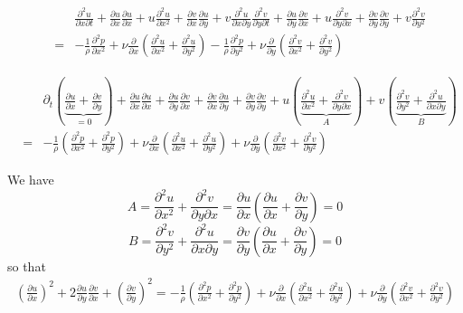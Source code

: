 \begin{eqnarray}
&&\frac{\partial^2 u}{\partial x \partial t}  
+ \frac{\partial u}{\partial x} \frac{\partial u}{\partial x}+ u \frac{\partial^2 u}{\partial x^2}
+ \frac{\partial v}{\partial x} \frac{\partial u}{\partial y}+ v \frac{\partial^2 u}{\partial x\partial y}
\frac{\partial^2 v}{\partial y \partial t}  
+ \frac{\partial u}{\partial y} \frac{\partial v}{\partial x}+ u \frac{\partial^2 v}{\partial y\partial x}
+ \frac{\partial v}{\partial y} \frac{\partial v}{\partial y}+ v \frac{\partial^2 v}{\partial y^2} \\
&=&
-\frac{1}{\rho} \frac{\partial^2 p}{\partial x^2} 
+ \nu \frac{\partial }{\partial x} \left( \frac{\partial^2 u}{\partial x^2} + \frac{\partial^2 u}{\partial y^2} \right) 
-\frac{1}{\rho} \frac{\partial^2 p}{\partial y^2} 
+ \nu \frac{\partial }{\partial y}  \left( \frac{\partial^2 v}{\partial x^2} + \frac{\partial^2 v}{\partial y^2} \right) 
\end{eqnarray}

\begin{eqnarray}
&&\partial_t ( \underbrace{\frac{\partial u}{\partial x } +  \frac{\partial v}{\partial y } }_{=0}  )
+ \frac{\partial u}{\partial x} \frac{\partial u}{\partial x}
+ \frac{\partial u}{\partial y} \frac{\partial v}{\partial x}
+ \frac{\partial v}{\partial x} \frac{\partial u}{\partial y}
+ \frac{\partial v}{\partial y} \frac{\partial v}{\partial y}
+ u (\underbrace{\frac{\partial^2 u}{\partial x^2} +  \frac{\partial^2 v}{\partial y\partial x}}_{A} )
+ v (\underbrace{\frac{\partial^2 v}{\partial y^2} +  \frac{\partial^2 u}{\partial x\partial y}}_{B} )\\
&=&
-\frac{1}{\rho} (\frac{\partial^2 p}{\partial x^2} + \frac{\partial^2 p}{\partial y^2})
+ \nu \frac{\partial }{\partial x} \left( \frac{\partial^2 u}{\partial x^2} + \frac{\partial^2 u}{\partial y^2} \right) 
+ \nu \frac{\partial }{\partial y}  \left( \frac{\partial^2 v}{\partial x^2} + \frac{\partial^2 v}{\partial y^2} \right) 
\end{eqnarray}


We have
\[
A = 
\frac{\partial^2 u}{\partial x^2} +  \frac{\partial^2 v}{\partial y\partial x}
=\frac{\partial u}{\partial x} ( \frac{\partial u}{\partial x}+ \frac{\partial v}{\partial y}) = 0
\]
\[
B 
=\frac{\partial^2 v}{\partial y^2}  +  \frac{\partial^2 u}{\partial x\partial y}
=\frac{\partial v}{\partial y} (\frac{\partial u}{\partial x} + \frac{\partial v}{\partial y}) =0
\]
so that 
\begin{eqnarray}
(\frac{\partial u}{\partial x})^2 
+ 2\frac{\partial u}{\partial y} \frac{\partial v}{\partial x}
+ (\frac{\partial v}{\partial y} )^2
=
-\frac{1}{\rho} (\frac{\partial^2 p}{\partial x^2} + \frac{\partial^2 p}{\partial y^2})
+ \nu \frac{\partial }{\partial x} \left( \frac{\partial^2 u}{\partial x^2} + \frac{\partial^2 u}{\partial y^2} \right) 
+ \nu \frac{\partial }{\partial y}  \left( \frac{\partial^2 v}{\partial x^2} + \frac{\partial^2 v}{\partial y^2} \right) 
\end{eqnarray}



